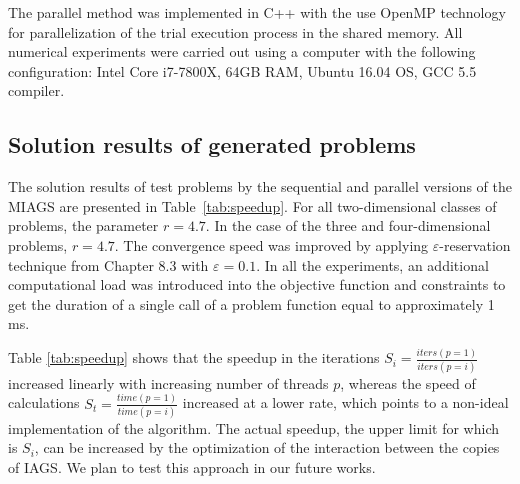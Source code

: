 \documentclass[runningheads]{llncs}
\begin{document}
The parallel method was implemented in  C++  with the use OpenMP technology for
parallelization of the trial execution process in the shared memory.
All numerical experiments were carried out using a computer with the following configuration:
Intel Core i7-7800X, 64GB RAM, Ubuntu 16.04 OS, GCC 5.5 compiler.

\subsection{Solution results of generated problems}

The solution results of test problems by the sequential and parallel versions of the
MIAGS are presented in Table~\ref{tab:speedup}.
For all two-dimensional classes of problems, the parameter \(r=4.7\).
In the case of the three and four-dimensional problems, \(r=4.7\).  The convergence speed
was improved by applying
\(\varepsilon\)-reservation technique from \cite{Strongin2000} Chapter 8.3 with
\(\varepsilon=0.1\).
In all the experiments, an additional computational load was introduced into the objective function
and constraints to get the duration of a single call of a problem function equal to
approximately 1 ms.

Table \ref{tab:speedup} shows that the speedup in the iterations \(S_i=\frac{iters(p=1)}{iters(p=i)}\) increased
linearly with increasing number of threads \(p\), whereas the speed of calculations \(S_t=\frac{time(p=1)}{time(p=i)}\) increased
at a lower rate, which points to a non-ideal implementation of the algorithm.
The actual speedup, the upper limit for which is \(S_i\), can be increased by the optimization
of the interaction between the copies of IAGS. We plan to test this approach in our future works.
\end{document}
